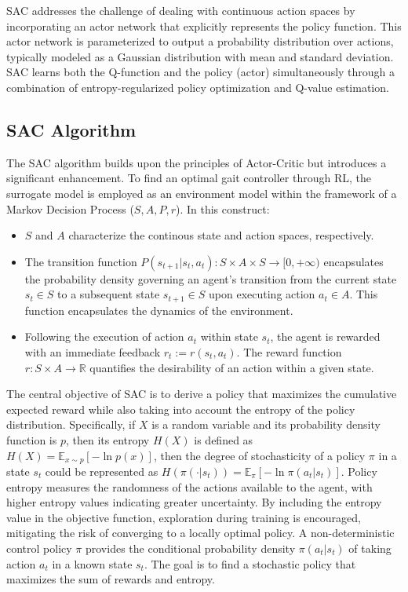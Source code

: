 SAC addresses the challenge of dealing with continuous action spaces by incorporating an actor network that explicitly represents the policy function. This actor network is parameterized to output a probability distribution over actions, typically modeled as a Gaussian distribution with mean and standard deviation. SAC learns both the Q-function and the policy (actor) simultaneously through a combination of entropy-regularized policy optimization and Q-value estimation.

\subsection{SAC Algorithm}
The \ac{SAC} algorithm builds upon the principles of Actor-Critic but introduces a significant enhancement. To find an optimal gait controller through RL, the surrogate model is employed as an environment model within the framework of a Markov Decision Process ($S, A, P, r$). In this construct:
\begin{itemize}
    \item $S$ and $A$ characterize the continous state and action spaces, respectively.
    \item The transition function $P(s_{t+1} | s_t, a_t): S \times A \times S \rightarrow [0,+\infty)$ encapsulates the probability density governing an agent's transition from the current state $s_t \in S$ to a subsequent state $s_{t+1} \in S$ upon executing action $a_t \in A$. This function encapsulates the dynamics of the environment.
    \item Following the execution of action $a_t$ within state $s_t$, the agent is rewarded with an immediate feedback $r_t := r(s_t, a_t)$. The reward function $r: S \times A \to \mathbb{R}$ quantifies the desirability of an action within a given state.
\end{itemize}

The central objective of SAC is to derive a policy that maximizes the cumulative expected reward while also taking into account the entropy of the policy distribution. Specifically, if $X$ is a random variable and its probability density function is $p$, then its entropy $H(X)$ is defined as $H(X) = \mathbb{E}_{x\sim p}[-\ln p(x)]$, then the degree of stochasticity of a policy $\pi$ in a state $s_t$ could be represented as $H(\pi(\cdot|s_t)) = \mathbb{E}_\pi[-\ln \pi(a_t|s_t)]$. Policy entropy measures the randomness of the actions available to the agent, with higher entropy values indicating greater uncertainty. By including the entropy value in the objective function, exploration during training is encouraged, mitigating the risk of converging to a locally optimal policy. A non-deterministic control policy $\pi$ provides the conditional probability density $\pi(a_t|s_t)$ of taking action $a_t$ in a known state $s_t$. The goal is to find a stochastic policy that maximizes the sum of rewards and entropy. 

